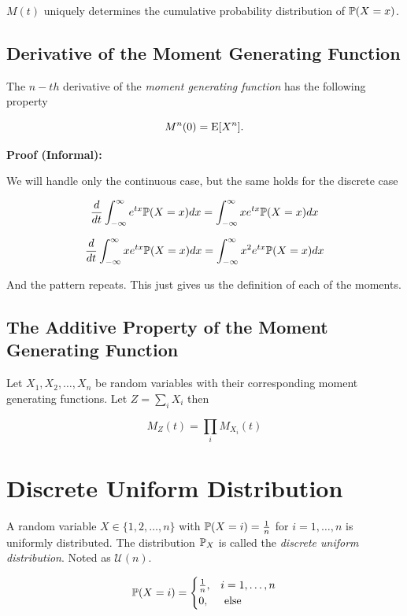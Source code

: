 \(M(t)\) uniquely determines the cumulative probability distribution of \(\mathbb{P}(X = x)\).

\subsection{Derivative of the Moment Generating Function}

The \(n-th\) derivative of the \emph{moment generating function} has the following property 

\[
    M^{n}(0) = \mathrm{E}[X^n].
\]

\textbf{Proof (Informal):}

We will handle only the continuous case, but the same holds for the discrete case 

\[
    \frac{d}{dt} \int_{-\infty}^{\infty} e^{tx} \mathbb{P}(X = x) dx  = \int_{-\infty}^{\infty} xe^{tx} \mathbb{P}(X = x) dx
\]

\[
    \frac{d}{dt} \int_{-\infty}^{\infty} xe^{tx} \mathbb{P}(X = x) dx  = \int_{-\infty}^{\infty} x^2 e^{tx} \mathbb{P}(X = x) dx
\]

And the pattern repeats. This just gives us the definition of each of the moments. 

\QED

\subsection{The Additive Property of the Moment Generating Function}

Let \(X_1, X_2, \dots, X_n\) be random variables with their corresponding moment generating functions.
Let \(Z = \sum_i X_i\) then 

\[
    M_Z (t) = \prod_{i} M_{X_i}(t)
\]

\section{Discrete Uniform Distribution}

A random variable \(X \in \{1, 2, \dots, n\}\) with 
\(\mathbb{P}(X = i) = \frac{1}{n}\) for \(i = 1, \dots, n\) is uniformly distributed. 
The distribution \(\mathbb{P}_X\) is called the \emph{discrete uniform distribution}. Noted as 
\(\mathcal{U}(n)\).

\[
    \mathbb{P}(X = i) = 
    \begin{cases}
    \frac{1}{n}, & i = 1, \dots, n \\ 
    0, & \text{ else }
    \end{cases}
\]

